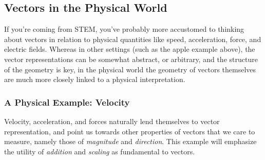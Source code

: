 \documentclass{ximera}
\begin{document}
\begin{exploration}
\begin{example}
    
\end{example}
\end{exploration}

\subsection{Vectors in the Physical World}

If you're coming from STEM, you've probably more accustomed to thinking about vectors in relation to physical quantities like speed, acceleration, force, and electric fields. Whereas in other settings (such as the apple example above), the vector representations can be somewhat abstract, or arbitrary, and the structure of the geometry is key, in the physical world the geometry of vectors themselves are much more closely linked to a physical interpretation.

\subsubsection{A Physical Example: Velocity}

Velocity, acceleration, and forces naturally lend themselves to vector representation, and point us towards other properties of vectors that we care to measure, namely those of \textit{magnitude} and \textit{direction}. This example will emphasize the utility of \textit{addition} and \textit{scaling} as fundamental to vectors.
\end{document}
